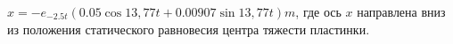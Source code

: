  $x=-e_{-2.5t}(0.05\cos13,77t+0.00907\sin13,77t) m$, где ось $x$
направлена вниз из положения статического равновесия центра тяжести пластинки.
